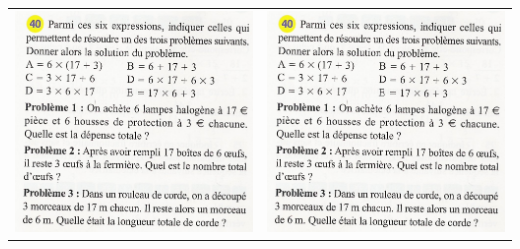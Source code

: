 \documentclass[12pt, twoside]{article}
\begin{document}
\begin{tabular}{cc}
\begin{minipage}{9cm}
\includegraphics[width=8cm]{image/pb.jpg}
\end{minipage}
&
\begin{minipage}{9cm}
\includegraphics[width=8cm]{image/pb.jpg}
\end{minipage}

\end{tabular}
\end{document}
